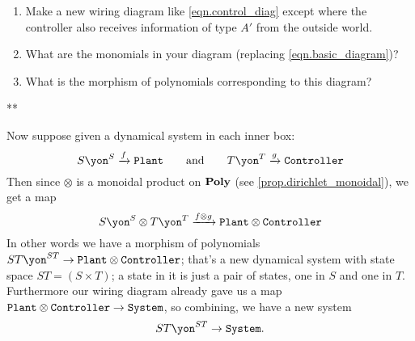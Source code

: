 \documentclass[Book-Poly]{subfiles}
\begin{document}
\begin{exercise}
\begin{enumerate}
	\item Make a new wiring diagram like \eqref{eqn.control_diag} except where the controller also receives information of type $A'$ from the outside world.
	\item What are the monomials in your diagram (replacing \eqref{eqn.basic_diagram})?
	\item What is the morphism of polynomials corresponding to this diagram?
\qedhere
\end{enumerate}
\begin{solution}
**
\end{solution}
\end{exercise}

Now suppose given a dynamical system in each inner box:
\[
S\yon^S\To{f}\const{Plant}
\qqand
T\yon^T\To{g}\const{Controller}
\]
Then since $\otimes$ is a monoidal product on $\mathbf{Poly}$ (see \cref{prop.dirichlet_monoidal}), we get a map
\[
S\yon^S\otimes T\yon^T\To{f\otimes g}\const{Plant}\otimes\const{Controller}
\]
In other words we have a morphism of polynomials $ST\yon^{ST}\to \const{Plant}\otimes\const{Controller}$; that's a new dynamical system with state space $ST=(S\times T)$; a state in it is just a pair of states, one in $S$ and one in $T$. Furthermore our wiring diagram already gave us a map $\texttt{Plant}\otimes\texttt{Controller}\to\texttt{System}$, so combining, we have a new system
\[
ST\yon^{ST}\to\const{System}.
\]
\end{document}
